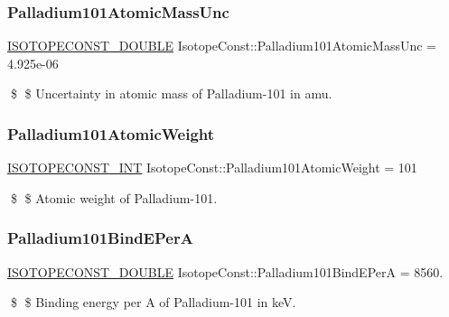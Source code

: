 \subsubsection{\texorpdfstring{Palladium101\+Atomic\+Mass\+Unc}{Palladium101AtomicMassUnc}}
{\footnotesize\ttfamily \mbox{\hyperlink{group___isotope_const-_macros_ga8f45a7272ce02c0b4c65c44636ed719a}{I\+S\+O\+T\+O\+P\+E\+C\+O\+N\+S\+T\+\_\+\+D\+O\+U\+B\+LE}} Isotope\+Const\+::\+Palladium101\+Atomic\+Mass\+Unc = 4.\+925e-\/06}

\$ \$ Uncertainty in atomic mass of Palladium-\/101 in amu. \mbox{\label{group___isotope_const-_palladium-_pd101_ga1acfdcf53fc7e5b5ab0cb45c43f811ac}} 
\subsubsection{\texorpdfstring{Palladium101\+Atomic\+Weight}{Palladium101AtomicWeight}}
{\footnotesize\ttfamily \mbox{\hyperlink{group___isotope_const-_macros_ga5f18360b3e99483a35c32d789e62621c}{I\+S\+O\+T\+O\+P\+E\+C\+O\+N\+S\+T\+\_\+\+I\+NT}} Isotope\+Const\+::\+Palladium101\+Atomic\+Weight = 101}

\$ \$ Atomic weight of Palladium-\/101. \mbox{\label{group___isotope_const-_palladium-_pd101_ga613506420c6286a231478fd3e1748b38}} 
\subsubsection{\texorpdfstring{Palladium101\+Bind\+E\+PerA}{Palladium101BindEPerA}}
{\footnotesize\ttfamily \mbox{\hyperlink{group___isotope_const-_macros_ga8f45a7272ce02c0b4c65c44636ed719a}{I\+S\+O\+T\+O\+P\+E\+C\+O\+N\+S\+T\+\_\+\+D\+O\+U\+B\+LE}} Isotope\+Const\+::\+Palladium101\+Bind\+E\+PerA = 8560.}

\$ \$ Binding energy per A of Palladium-\/101 in keV. \mbox{\label{group___isotope_const-_palladium-_pd101_gaee2d13e1c564da62fd571173f94e557b}} 
